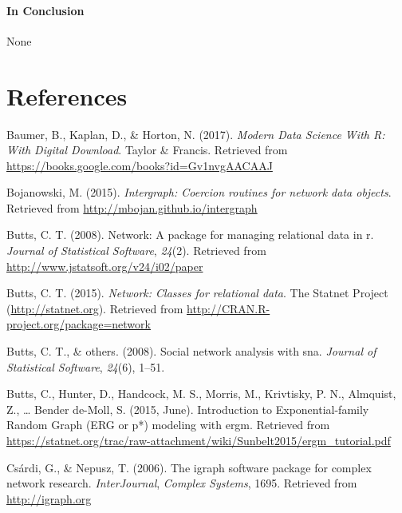 \documentclass[12pt,twoside]{amherstthesis}
\begin{document}
  \subsubsection{In Conclusion}\label{in-conclusion}
  
  None
  
  \backmatter
  
  \chapter{References}\label{references}
  
  \noindent
  
  \setlength{\parindent}{-0.20in} \setlength{\leftskip}{0.20in}
  \setlength{\parskip}{8pt}
  
  \hypertarget{refs}{}
  \hypertarget{ref-baumer_modern_2017}{}
  Baumer, B., Kaplan, D., \& Horton, N. (2017). \emph{Modern Data Science
  With R: With Digital Download}. Taylor \& Francis. Retrieved from
  \url{https://books.google.com/books?id=Gv1nvgAACAAJ}
  
  \hypertarget{ref-intergraphpackagemanual}{}
  Bojanowski, M. (2015). \emph{Intergraph: Coercion routines for network
  data objects}. Retrieved from \url{http://mbojan.github.io/intergraph}
  
  \hypertarget{ref-networkpackagearticle}{}
  Butts, C. T. (2008). Network: A package for managing relational data in
  r. \emph{Journal of Statistical Software}, \emph{24}(2). Retrieved from
  \url{http://www.jstatsoft.org/v24/i02/paper}
  
  \hypertarget{ref-networkpackagemanual}{}
  Butts, C. T. (2015). \emph{Network: Classes for relational data}. The
  Statnet Project (\url{http://statnet.org}). Retrieved from
  \url{http://CRAN.R-project.org/package=network}
  
  \hypertarget{ref-butts2008social}{}
  Butts, C. T., \& others. (2008). Social network analysis with sna.
  \emph{Journal of Statistical Software}, \emph{24}(6), 1--51.
  
  \hypertarget{ref-butts_introduction_2015}{}
  Butts, C., Hunter, D., Handcock, M. S., Morris, M., Krivtisky, P. N.,
  Almquist, Z., \ldots{} Bender de-Moll, S. (2015, June). Introduction to
  Exponential-family Random Graph (ERG or p*) modeling with ergm.
  Retrieved from
  \url{https://statnet.org/trac/raw-attachment/wiki/Sunbelt2015/ergm_tutorial.pdf}
  
  \hypertarget{ref-igraphpackage}{}
  Csárdi, G., \& Nepusz, T. (2006). The igraph software package for
  complex network research. \emph{InterJournal}, \emph{Complex Systems},
  1695. Retrieved from \url{http://igraph.org}
  
\end{document}
